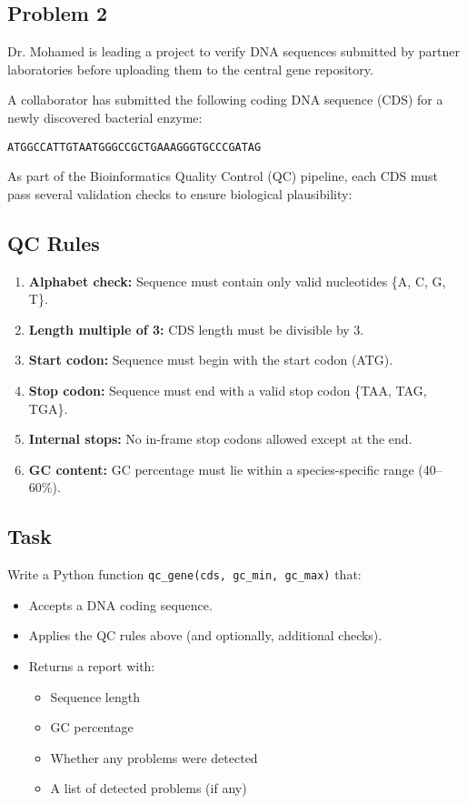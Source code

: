 \documentclass[12pt]{article}
\begin{document}
\newpage
\subsection{Problem 2}
Dr. Mohamed is leading a project to verify DNA sequences submitted by partner laboratories before uploading them to the central gene repository.

A collaborator has submitted the following coding DNA sequence (CDS) for a newly discovered bacterial enzyme:

\begin{center}
\texttt{ATGGCCATTGTAATGGGCCGCTGAAAGGGTGCCCGATAG}
\end{center}

As part of the Bioinformatics Quality Control (QC) pipeline, each CDS must pass several validation checks to ensure biological plausibility:

\subsection*{QC Rules}
\begin{enumerate}[leftmargin=1.2cm]
    \item \textbf{Alphabet check:} Sequence must contain only valid nucleotides \{A, C, G, T\}.
    \item \textbf{Length multiple of 3:} CDS length must be divisible by 3.
    \item \textbf{Start codon:} Sequence must begin with the start codon (ATG).
    \item \textbf{Stop codon:} Sequence must end with a valid stop codon \{TAA, TAG, TGA\}.
    \item \textbf{Internal stops:} No in-frame stop codons allowed except at the end.
    \item \textbf{GC content:} GC percentage must lie within a species-specific range (40--60\%).
\end{enumerate}

\subsection*{Task}
Write a Python function \texttt{qc\_gene(cds, gc\_min, gc\_max)} that:
\begin{itemize}[leftmargin=1.2cm]
    \item Accepts a DNA coding sequence.
    \item Applies the QC rules above (and optionally, additional checks).
    \item Returns a report with:
    \begin{itemize}
        \item Sequence length
        \item GC percentage
        \item Whether any problems were detected
        \item A list of detected problems (if any)
    \end{itemize}
\end{itemize}
\end{document}
